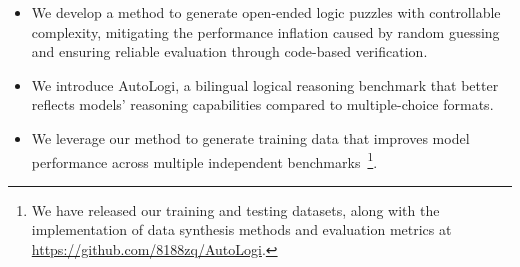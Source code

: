 \begin{itemize}
\item We develop a method to generate open-ended logic puzzles with controllable complexity, mitigating the performance inflation caused by random guessing and ensuring reliable evaluation through code-based verification.
\item We introduce AutoLogi, a bilingual logical reasoning benchmark that better reflects models' reasoning capabilities compared to multiple-choice formats.
\item We leverage our method to generate training data that improves model performance across multiple independent benchmarks~\footnote{We have released our training and testing datasets, along with the implementation of data synthesis methods and evaluation metrics at \url{https://github.com/8188zq/AutoLogi}.}.
\end{itemize}